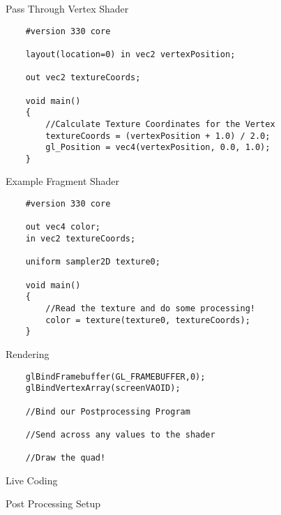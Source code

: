 \begin{frame}[fragile]{Pass Through Vertex Shader}
	\begin{lstlisting}
	#version 330 core
	
	layout(location=0) in vec2 vertexPosition;
	
	out vec2 textureCoords;
	
	void main()
	{
		//Calculate Texture Coordinates for the Vertex
		textureCoords = (vertexPosition + 1.0) / 2.0;
		gl_Position = vec4(vertexPosition, 0.0, 1.0);
	}
	\end{lstlisting}
\end{frame}

\begin{frame}[fragile]{Example Fragment Shader}
	\begin{lstlisting}
	#version 330 core

	out vec4 color;
	in vec2 textureCoords;

	uniform sampler2D texture0;

	void main()
	{
		//Read the texture and do some processing!
		color = texture(texture0, textureCoords);
	}
	\end{lstlisting}
\end{frame}

\begin{frame}[fragile]{Rendering}
	\begin{lstlisting}
	glBindFramebuffer(GL_FRAMEBUFFER,0);
	glBindVertexArray(screenVAOID);
	
	//Bind our Postprocessing Program
	
	//Send across any values to the shader
	
	//Draw the quad!
	\end{lstlisting}
\end{frame}

\begin{frame}{Live Coding}
	\begin{center}
		Post Processing Setup
	\end{center}
\end{frame}